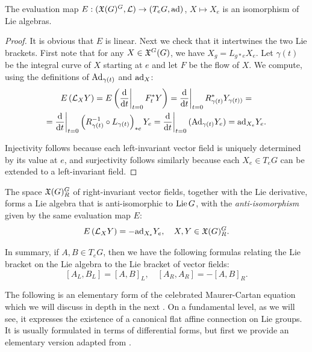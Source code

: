 \begin{thm}
    The evaluation map $E:(\mathfrak{X}(G)^G,\mathcal{L})\to (T_eG,\mathrm{ad})$, $X\mapsto X_e$ is an isomorphism of Lie algebras.
\end{thm}
\begin{proof}
    It is obvious that $E$ is linear. Next we check that it intertwines the two Lie brackets. First note that for any $X\in \mathfrak{X}^G(G)$, we have $X_g=L_{g\ast e}X_e$. Let $\gamma(t)$ be the integral curve of $X$ starting at $e$ and let $F$ be the flow of $X$. We compute, using the definitions of $\mathrm{Ad}_{\gamma(t)}$ and $\mathrm{ad}_X$:
    \begin{multline}
        E\left(\Lie_X Y\right)=E\left(\restr{\frac{\dd}{\dd t}}{t=0} F^\ast_t Y\right)= \restr{\frac{\dd}{\dd t}}{t=0}R_{\gamma(t)}^{\ast}Y_{\gamma(t))}=\\=\restr{\frac{\dd}{\dd t}}{t=0}\left(R_{\gamma(t)}^{-1}\circ L_{\gamma(t)}\right)_{\ast e} Y_{e}=\restr{\frac{\dd}{\dd t}}{t=0}(\Ad_{\gamma(t)}Y_e)=\ad_{X_e} Y_e.
    \end{multline}

    Injectivity follows because each left-invariant vector field is uniquely determined by its value at $e$, and surjectivity follows similarly because each $X_e\in T_eG$ can be extended to a left-invariant field.
\end{proof}
\begin{cor}
    The space $\mathfrak{X}(G)^G_R$ of right-invariant vector fields, together with the Lie derivative, forms a Lie algebra that is anti-isomorphic to $\operatorname{Lie} G$, with the \emph{anti-isomorphism} given by the same evaluation map $E$:
    \[E\left(\mathcal{L}_{X}Y\right)=-\mathrm{ad}_{X_e} Y_e,\quad X,Y\in\mathfrak{X}(G)^G_R.\]
\end{cor}

In summary, if $A,B\in T_eG$, then we have the following formulas relating the Lie bracket on the Lie algebra to the Lie bracket of vector fields:
\[[A_L,B_L]=[A,B]_L,\quad [A_R,A_R]=-[A,B]_R.\]


The following is an elementary form of the celebrated Maurer-Cartan equation which we will discuss in depth in the next \subsect. On a fundamental level, as we will see, it expresses the existence of a canonical flat affine connection on Lie groups. It is usually formulated in terms of differential forms, but first we provide an elementary version adapted from \cite{Onishchik}.


